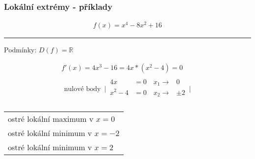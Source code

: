 \subsubsection{Lokální extrémy - příklady}
\begin{align}
  f(x)=x^4-8x^2+16
\end{align}
\hrule
\begin{center}
  Podmínky: $D(f)=\mathbb{R}$
\end{center}
\begin{align*}
  f'(x)=4x^3-16=4x*(x^2-4)=0 \\
  \begin{alignedat}{2}
  \text{nulové body  }\,
  \Biggr|\,
    \begin{alignedat}{2}
      4x &=0 \quad x_1 \rightarrow &0 \\
      x^2-4 &=0 \quad x_2 \rightarrow &\pm2 \\
    \end{alignedat}
  \,\Biggr|
  \end{alignedat}
\end{align*}
\begin{center}
  \begin{tabular}{l}
    ostré lokální maximum v $x=0$\\
    ostré lokální minimum v $x=-2$\\
    ostré lokální minimum v $x=2$
  \end{tabular}
\end{center}
\begin{center}
\end{center}

